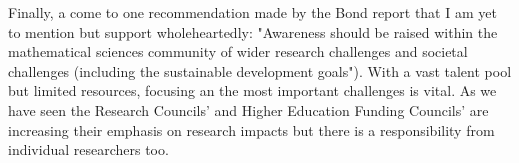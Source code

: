 \documentclass[11pt]{article} %
\begin{document}
Finally, a come to one recommendation made by the Bond report \cite{Bond} that I am yet to mention but support wholeheartedly: "Awareness should be raised within the mathematical sciences community of wider research challenges and societal challenges (including the sustainable development goals"). With a vast talent pool but limited resources, focusing an the most important challenges is vital. As we have seen the Research Councils' and Higher Education Funding Councils' are increasing their emphasis on research impacts but there is a responsibility from individual researchers too. 
 
\pagebreak	
	
	
\end{document}
